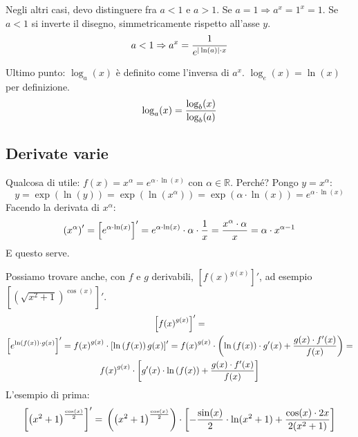 \documentclass[12pt,a4paper]{article}
\begin{document}
Negli altri casi, devo distinguere fra $a<1$ e $a>1$.
Se $a=1 \Rightarrow a^x = 1^x = 1$.
Se $a<1$ si inverte il disegno, simmetricamente rispetto all'asse
$y$.
$$ a<1 \Rightarrow a^x = {1 \over e^{|\ln(a)| \cdot x}} $$

\begin{center}
\end{center}

Ultimo punto: $\log_a(x)$ \`e definito come l'inversa di $a^x$.
$\log_e(x) = \ln(x)$ per definizione.
$$ \log_a(x) = {\log_b(x) \over \log_b(a)} $$

\subsection{Derivate varie}
Qualcosa di utile: $f(x) = x^{\alpha} = e^{\alpha \cdot \ln(x)}$
con $\alpha \in \mathbb{R}$. Perch\'e? Pongo $y=x^{\alpha}$:
$$ y = \exp \left( \ln(y) \right) = \exp \left( \ln(x^{\alpha}) \right) =
\exp \left( \alpha \cdot \ln(x) \right) = e^{\alpha \cdot \ln(x)} $$
Facendo la derivata di $x^{\alpha}$:
$$
\left( x^{\alpha} \right)' = \left[ e^{\alpha \cdot \ln(x)} \right]' =
e^{\alpha \cdot \ln(x)} \cdot \alpha \cdot {1 \over x} =
{x^{\alpha} \cdot \alpha \over x} = \alpha \cdot x^{\alpha - 1}
$$
E questo serve.

Possiamo trovare anche, con $f$ e $g$ derivabili, 
$ \left[ {f(x)}^{g(x)} \right]' $, ad esempio 
$ \left[ {\left( \sqrt{x^2 +1} \right)}^{\cos(x)} \right]'$.
\begin{multline}
\left[ {f(x)}^{g(x)} \right]' = \\
\left[ e^{\ln \left(f(x) \right) \cdot g(x)} \right]' =
{f(x)}^{g(x)} \cdot \left[ \ln \left( f(x) \right) g(x) \right]' =
{f(x)}^{g(x)} \cdot \left( \ln \left( f(x) \right) \cdot g'(x)
+ {g(x) \cdot f'(x) \over f(x)} \right) = \\
{f(x)}^{g(x)} \cdot \left[ g'(x) \cdot \ln \left( f(x) \right)
+ {g(x) \cdot f'(x) \over f(x)} \right]
\end{multline}
L'esempio di prima:
$$
\left[ {\left( x^2 +1 \right)}^{\cos(x) \over 2} \right]' = \\
\left( {\left( x^2 +1 \right)}^{\cos(x) \over 2} \right) \cdot
\left[ - {\sin(x) \over 2} \cdot \ln(x^2 +1) +
{ \cos(x) \cdot 2x \over 2 (x^2 +1)} \right]
$$
\end{document}
